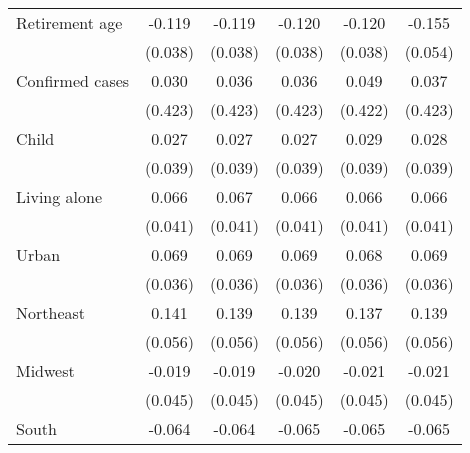 {\begin{tabular}{l*{5}{c}}
\addlinespace
Retirement age      &      -0.119\sym{***}&      -0.119\sym{***}&      -0.120\sym{***}&      -0.120\sym{***}&      -0.155\sym{***}\\
                    &     (0.038)         &     (0.038)         &     (0.038)         &     (0.038)         &     (0.054)         \\
\addlinespace
Confirmed cases     &       0.030         &       0.036         &       0.036         &       0.049         &       0.037         \\
                    &     (0.423)         &     (0.423)         &     (0.423)         &     (0.422)         &     (0.423)         \\
\addlinespace
Child               &       0.027         &       0.027         &       0.027         &       0.029         &       0.028         \\
                    &     (0.039)         &     (0.039)         &     (0.039)         &     (0.039)         &     (0.039)         \\
\addlinespace
Living alone        &       0.066         &       0.067         &       0.066         &       0.066         &       0.066         \\
                    &     (0.041)         &     (0.041)         &     (0.041)         &     (0.041)         &     (0.041)         \\
\addlinespace
Urban               &       0.069\sym{*}  &       0.069\sym{*}  &       0.069\sym{*}  &       0.068\sym{*}  &       0.069\sym{*}  \\
                    &     (0.036)         &     (0.036)         &     (0.036)         &     (0.036)         &     (0.036)         \\
\addlinespace
Northeast           &       0.141\sym{**} &       0.139\sym{**} &       0.139\sym{**} &       0.137\sym{**} &       0.139\sym{**} \\
                    &     (0.056)         &     (0.056)         &     (0.056)         &     (0.056)         &     (0.056)         \\
\addlinespace
Midwest             &      -0.019         &      -0.019         &      -0.020         &      -0.021         &      -0.021         \\
                    &     (0.045)         &     (0.045)         &     (0.045)         &     (0.045)         &     (0.045)         \\
\addlinespace
South               &      -0.064         &      -0.064         &      -0.065         &      -0.065         &      -0.065         \\

\end{tabular}}
